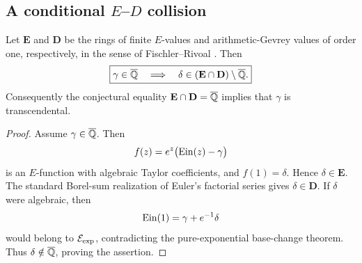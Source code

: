 \subsection{A conditional \texorpdfstring{\(E\)--\(D\)}{E--D} collision}

\begin{corollary}
\label{cor:gamma-algebraic-ED-collision}
Let \(\mathbf E\) and \(\mathbf D\) be the rings of finite \(E\)-values
and arithmetic-Gevrey values of order one, respectively, in the sense of
Fischler--Rivoal \cite{FR2024ED}.  Then
\begin{equation}\label{eq:gamma-algebraic-ED-collision}
 \boxed{
 \gamma\in\overline{\mathbb Q}
 \quad\Longrightarrow\quad
 \delta\in(\mathbf E\cap\mathbf D)\setminus\overline{\mathbb Q}.}
\end{equation}
Consequently the conjectural equality
\(\mathbf E\cap\mathbf D=\overline{\mathbb Q}\) implies that \(\gamma\) is
transcendental.
\end{corollary}

\begin{proof}
Assume \(\gamma\in\overline{\mathbb Q}\).  Then
\[
 f(z)=e^z\bigl(\operatorname{Ein}(z)-\gamma\bigr)
\]
is an \(E\)-function with algebraic Taylor coefficients, and
\(f(1)=\delta\).  Hence \(\delta\in\mathbf E\).  The standard Borel-sum
realization of Euler's factorial series gives \(\delta\in\mathbf D\).
If \(\delta\) were algebraic, then
\[
 \operatorname{Ein}(1)=\gamma+e^{-1}\delta
\]
would belong to \(\mathcal E_{\mathrm{exp}}\), contradicting the pure-exponential base-change
theorem.  Thus \(\delta\notin\overline{\mathbb Q}\), proving the assertion.
\end{proof}
